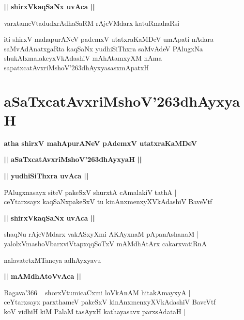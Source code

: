 \documentclass[twoside,12pt,openright]{book}
\def\S{\char'263}
\newcounter{shloka}[chapter]
\def\uvaca#1{\centerline{{\large\textbf{#1}}}}
\begin{document}
\uvaca{|| shirxVkaqSaNx uvAca ||}

\begin{shloka}%
varxtameVtadudxrAdhaSaRM rAjeVMdarx katuRmahaRsi
\end{shloka}

\begin{center}
iti shirxV mahapurANeV pademxV utatxraKaMDeV umApati nAdara saMvAdAnatxgaRta kaqSaNx yudhiSiThxra 
saMvAdeV PAlugxNa shukAlxmalakeyxVkAdashiV mAhAtamxyXM nAma sapatxcatAvxriMshoV\S dhAyxyasasxmApatxH
\end{center}

\chapter{aSaTxcatAvxriMshoV\S dhAyxyaH}

\begin{center}
{\LARGE\bfseries atha shirxV mahApurANeV pAdemxV utatxraKaMDeV}
\end{center}

\begin{center}
{\LARGE\bfseries || aSaTxcatAvxriMshoV\S dhAyxyaH ||}
\end{center}

\uvaca{|| yudhiSiThxra uvAca ||}

\begin{shloka}%
PAlugxnasayx siteV pakeSxV shurxtA cAmalakiV tathA |\\
ceYtarxsayx kaqSaNxpakeSxV tu kinAnxmenxyXVkAdashiV BaveVtf
\end{shloka}

\uvaca{|| shirxVkaqSaNx uvAca ||}

\begin{shloka}%
shaqNu rAjeVMdarx vakASxyXmi AKAyxnaM pApanAshanaM |\\
yalolxVmashoVbarxviVtapxqqSoTxV mAMdhAtArx cakarxvatiRnA 
\end{shloka}

\begin{center}
nalavatetxMTaneya adhAyxyavu
\end{center}

\uvaca{|| mAMdhAtoVvAca ||}

\begin{shloka}%
Bagava\char'366 ~ shorxVtumicaCxmi loVkAnAM hitakAmayxyA |\\
ceYtarxsayx parxthameV pakeSxV kinAnxmenxyXVkAdashiV BaveVtf \\
koV vidhiH kiM PalaM tasAyxH kathayasavx parxsAdataH |\\
\end{shloka}
\end{document}
